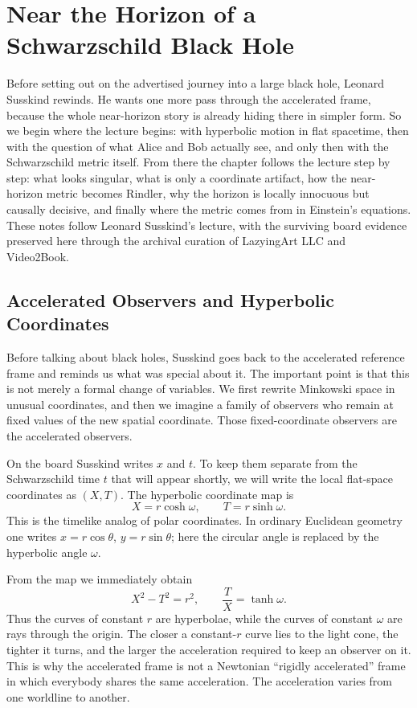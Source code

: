 \chapter{Near the Horizon of a Schwarzschild Black Hole}

Before setting out on the advertised journey into a large black hole, Leonard Susskind rewinds. He wants one more pass through the accelerated frame, because the whole near-horizon story is already hiding there in simpler form. So we begin where the lecture begins: with hyperbolic motion in flat spacetime, then with the question of what Alice and Bob actually see, and only then with the Schwarzschild metric itself. From there the chapter follows the lecture step by step: what looks singular, what is only a coordinate artifact, how the near-horizon metric becomes Rindler, why the horizon is locally innocuous but causally decisive, and finally where the metric comes from in Einstein’s equations. These notes follow Leonard Susskind’s lecture, with the surviving board evidence preserved here through the archival curation of LazyingArt LLC and Video2Book.

\section{Accelerated Observers and Hyperbolic Coordinates}

Before talking about black holes, Susskind goes back to the accelerated reference frame and reminds us what was special about it. The important point is that this is not merely a formal change of variables. We first rewrite Minkowski space in unusual coordinates, and then we imagine a family of observers who remain at fixed values of the new spatial coordinate. Those fixed-coordinate observers are the accelerated observers.

On the board Susskind writes \(x\) and \(t\). To keep them separate from the Schwarzschild time \(t\) that will appear shortly, we will write the local flat-space coordinates as \((X,T)\). The hyperbolic coordinate map is
\begin{equation}
X=r\cosh\omega,
\qquad
T=r\sinh\omega.
\end{equation}
This is the timelike analog of polar coordinates. In ordinary Euclidean geometry one writes \(x=r\cos\theta\), \(y=r\sin\theta\); here the circular angle is replaced by the hyperbolic angle \(\omega\).

From the map we immediately obtain
\begin{equation}
X^2-T^2=r^2,
\qquad
\frac{T}{X}=\tanh\omega.
\end{equation}
Thus the curves of constant \(r\) are hyperbolae, while the curves of constant \(\omega\) are rays through the origin. The closer a constant-\(r\) curve lies to the light cone, the tighter it turns, and the larger the acceleration required to keep an observer on it. This is why the accelerated frame is not a Newtonian ``rigidly accelerated'' frame in which everybody shares the same acceleration. The acceleration varies from one worldline to another.

